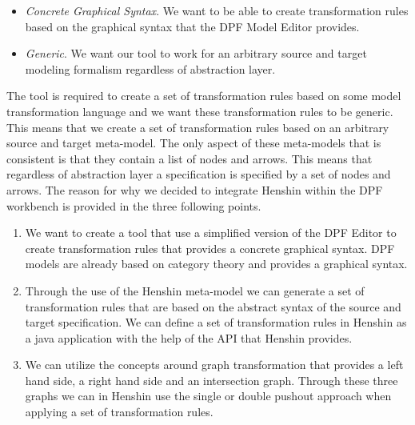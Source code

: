 \begin{itemize}

\item \textit{Concrete Graphical Syntax}. We want to be able to create
transformation rules based on the graphical syntax that the DPF Model Editor
provides.

\item \textit{Generic}. We want our tool to work for an arbitrary source and
target modeling formalism regardless of abstraction layer. 

\end{itemize}

The tool is required to create a set of transformation rules based on some
model transformation language and we want these transformation rules to be
generic. This means that we create a set of transformation rules based on an
arbitrary source and target meta-model. The only aspect of these meta-models
that is consistent is that they contain a list of nodes and arrows. This means
that regardless of abstraction layer a specification is specified by a set of
nodes and arrows. The reason for why we decided to integrate Henshin
within the DPF workbench is provided in the three following points. 

\begin{enumerate}

\item We want to create a tool that use a simplified version of the DPF Editor
to create transformation rules that provides a concrete graphical syntax. DPF
models are already based on category theory and provides a graphical syntax. 

\item Through the use of the Henshin meta-model we can generate a set of
transformation rules that are based on the abstract syntax of the source and
target specification. We can define a set of transformation rules in Henshin
as a java application with the help of the API that Henshin provides. 

\item We can utilize the concepts around graph transformation that provides a
left hand side, a right hand side and an intersection graph. Through these three
graphs we can in Henshin use the single or double pushout approach when applying
a set of transformation rules. 

\end{enumerate}


